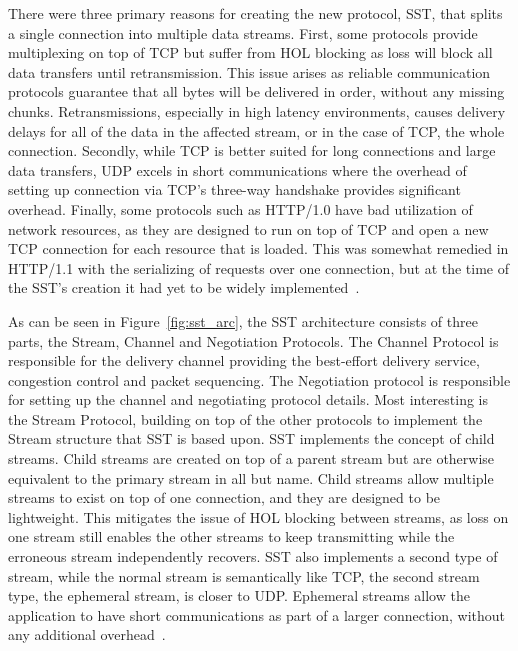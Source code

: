 \documentclass[english, 12pt, a4paper, elec, utf8, a-2b, online]{aaltothesis}
\begin{document}
There were three primary reasons for creating the new protocol, SST, that splits
a single connection into multiple data streams. First, some protocols provide
multiplexing on top of TCP but suffer from HOL blocking as loss will block all
data transfers until retransmission. This issue arises as reliable communication
protocols guarantee that all bytes will be delivered in order, without any missing
chunks. Retransmissions, especially in high latency environments, causes delivery
delays for all of the data in the affected stream, or in the case of TCP, the
whole connection. Secondly, while
TCP is better suited for long connections and large data transfers, UDP excels
in short communications where the overhead of setting up connection via TCP's three-way
handshake provides significant overhead.  Finally, some protocols such as HTTP/1.0
have bad utilization of network resources, as they are designed to run on top of TCP
and open a new TCP connection for each resource that is loaded. This
was somewhat remedied in HTTP/1.1 with the serializing of requests over one connection,
but at the time of the SST's creation it had yet to be widely implemented~\cite{sst}.

As can be seen in Figure~\ref{fig:sst_arc}, the SST architecture consists of three
parts, the Stream, Channel and Negotiation Protocols. The Channel Protocol is responsible
for the delivery channel providing the best-effort delivery service, congestion control
and packet sequencing. The Negotiation protocol is responsible for setting up the channel
and negotiating protocol details. Most interesting is the Stream Protocol, building on
top of the other protocols to implement the Stream structure that SST is based upon.
SST implements the concept of child streams. Child streams are created on top of
a parent stream but are otherwise equivalent to the primary stream in all but name.
Child streams allow multiple streams to exist on top of one connection, and they
are designed to be lightweight. This mitigates the issue of HOL blocking between streams,
as loss on one stream still enables the other streams to keep transmitting while
the erroneous stream independently recovers. SST also implements a second type of stream,
while the normal stream is semantically like TCP, the second stream type, the ephemeral stream, is closer
to UDP. Ephemeral streams allow the application to have short communications as part
of a larger connection, without any additional overhead~\cite{sst}.
\end{document}
